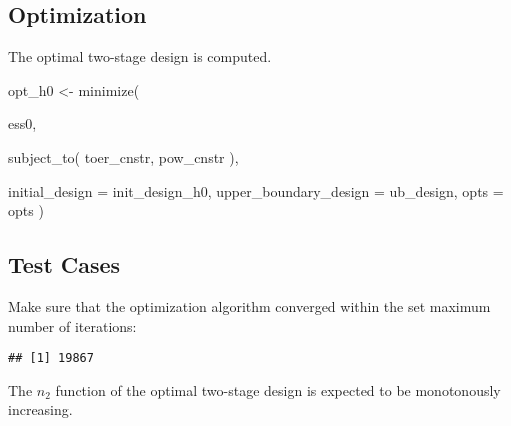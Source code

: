 \documentclass[
]{book}
\newenvironment{Shaded}{\begin{snugshade}}{\end{snugshade}}
\newcommand{\AttributeTok}[1]{\textcolor[rgb]{0.77,0.63,0.00}{#1}}
\newcommand{\DecValTok}[1]{\textcolor[rgb]{0.00,0.00,0.81}{#1}}
\newcommand{\FunctionTok}[1]{\textcolor[rgb]{0.00,0.00,0.00}{#1}}
\newcommand{\NormalTok}[1]{#1}
\newcommand{\OtherTok}[1]{\textcolor[rgb]{0.56,0.35,0.01}{#1}}
\newcommand{\SpecialCharTok}[1]{\textcolor[rgb]{0.00,0.00,0.00}{#1}}
\begin{document}
\hypertarget{optimization-1}{%
\subsection{Optimization}\label{optimization-1}}

The optimal two-stage design is computed.

\begin{Shaded}
\begin{Highlighting}[]
\NormalTok{opt\_h0 }\OtherTok{\textless{}{-}} \FunctionTok{minimize}\NormalTok{(}
  
\NormalTok{    ess0,}
    
    \FunctionTok{subject\_to}\NormalTok{(}
\NormalTok{        toer\_cnstr,}
\NormalTok{        pow\_cnstr}
\NormalTok{    ),}
    
    \AttributeTok{initial\_design        =}\NormalTok{ init\_design\_h0,}
    \AttributeTok{upper\_boundary\_design =}\NormalTok{ ub\_design,}
    \AttributeTok{opts =}\NormalTok{ opts )}
\end{Highlighting}
\end{Shaded}

\hypertarget{test-cases-1}{%
\subsection{Test Cases}\label{test-cases-1}}

Make sure that the optimization algorithm converged within the set
maximum number of iterations:

\begin{Shaded}
\end{Shaded}

\begin{verbatim}
## [1] 19867
\end{verbatim}

The \(n_2\) function of the optimal two-stage design is expected to be
monotonously increasing.

\begin{Shaded}
\end{Shaded}
\end{document}
